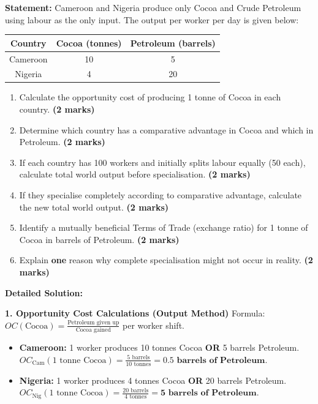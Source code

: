 \documentclass[11pt]{article}
\begin{document}
\begin{exoresolu}
\textbf{Statement:} Cameroon and Nigeria produce only Cocoa and Crude Petroleum using labour as the only input. The output per worker per day is given below:
\begin{center}
\begin{tabular}{|c|c|c|}\hline
\textbf{Country} & \textbf{Cocoa (tonnes)} & \textbf{Petroleum (barrels)} \\ \hline
Cameroon & 10 & 5 \\ \hline
Nigeria & 4 & 20 \\ \hline
\end{tabular}
\end{center}
\begin{enumerate}
    \item Calculate the opportunity cost of producing 1 tonne of Cocoa in each country. \textbf{(2 marks)}
    \item Determine which country has a comparative advantage in Cocoa and which in Petroleum. \textbf{(2 marks)}
    \item If each country has 100 workers and initially splits labour equally (50 each), calculate total world output before specialisation. \textbf{(2 marks)}
    \item If they specialise completely according to comparative advantage, calculate the new total world output. \textbf{(2 marks)}
    \item Identify a mutually beneficial Terms of Trade (exchange ratio) for 1 tonne of Cocoa in barrels of Petroleum. \textbf{(2 marks)}
    \item Explain \textbf{one} reason why complete specialisation might not occur in reality. \textbf{(2 marks)}
\end{enumerate}

\tcblower
\textbf{Detailed Solution:}

\textbf{1. Opportunity Cost Calculations (Output Method)}
Formula: $OC(\text{Cocoa}) = \frac{\text{Petroleum given up}}{\text{Cocoa gained}}$ per worker shift.

\begin{itemize}
    \item \textbf{Cameroon:} 1 worker produces 10 tonnes Cocoa \textbf{OR} 5 barrels Petroleum.
    $OC_{\text{Cam}}(\text{1 tonne Cocoa}) = \frac{5 \text{ barrels}}{10 \text{ tonnes}} = \mathbf{0.5 \text{ barrels of Petroleum}}$.
    \item \textbf{Nigeria:} 1 worker produces 4 tonnes Cocoa \textbf{OR} 20 barrels Petroleum.
    $OC_{\text{Nig}}(\text{1 tonne Cocoa}) = \frac{20 \text{ barrels}}{4 \text{ tonnes}} = \mathbf{5 \text{ barrels of Petroleum}}$.
\end{itemize}


\end{exoresolu}
\end{document}
